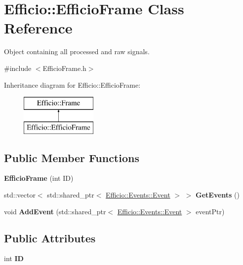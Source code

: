 \hypertarget{class_efficio_1_1_efficio_frame}{}\section{Efficio\+:\+:Efficio\+Frame Class Reference}
\label{class_efficio_1_1_efficio_frame}


Object containing all processed and raw signals.  




{\ttfamily \#include $<$Efficio\+Frame.\+h$>$}

Inheritance diagram for Efficio\+:\+:Efficio\+Frame\+:\begin{figure}[H]
\begin{center}
\leavevmode
\includegraphics[height=2.000000cm]{class_efficio_1_1_efficio_frame}
\end{center}
\end{figure}
\subsection*{Public Member Functions}
\begin{DoxyCompactItemize}
\item 
\hypertarget{class_efficio_1_1_efficio_frame_a9b49dc8882fa2c58ebcd8710bb14de91}{}\label{class_efficio_1_1_efficio_frame_a9b49dc8882fa2c58ebcd8710bb14de91} 
{\bfseries Efficio\+Frame} (int ID)
\item 
\hypertarget{class_efficio_1_1_efficio_frame_a219e88c37091c04515e7022c65300654}{}\label{class_efficio_1_1_efficio_frame_a219e88c37091c04515e7022c65300654} 
std\+::vector$<$ std\+::shared\+\_\+ptr$<$ \hyperlink{class_efficio_1_1_events_1_1_event}{Efficio\+::\+Events\+::\+Event} $>$ $>$ {\bfseries Get\+Events} ()
\item 
\hypertarget{class_efficio_1_1_efficio_frame_a2a50c673ea34e5d85707a55099ebae63}{}\label{class_efficio_1_1_efficio_frame_a2a50c673ea34e5d85707a55099ebae63} 
void {\bfseries Add\+Event} (std\+::shared\+\_\+ptr$<$ \hyperlink{class_efficio_1_1_events_1_1_event}{Efficio\+::\+Events\+::\+Event} $>$ event\+Ptr)
\end{DoxyCompactItemize}
\subsection*{Public Attributes}
\begin{DoxyCompactItemize}
\item 
\hypertarget{class_efficio_1_1_efficio_frame_aa994a72ec58afb3b6b64b9e05a9d0ba9}{}\label{class_efficio_1_1_efficio_frame_aa994a72ec58afb3b6b64b9e05a9d0ba9} 
int {\bfseries ID}
\end{DoxyCompactItemize}


